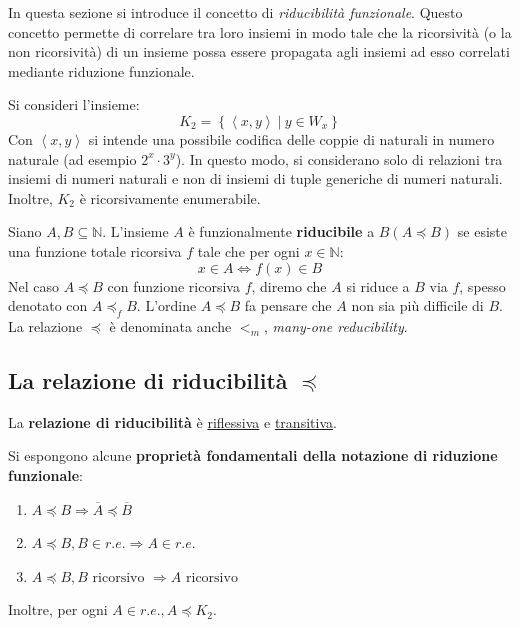 \documentclass[a4paper]{article}
\begin{document}
	In questa sezione si introduce il concetto di \emph{riducibilità funzionale}. Questo concetto permette di correlare tra loro insiemi in modo tale che la ricorsività (o la non ricorsività) di un insieme possa essere propagata agli insiemi ad esso correlati mediante riduzione funzionale.\newline

	\noindent
	Si consideri l'insieme:
	\begin{equation*}
		K_{2} = \left\{\left\langle x,y \right\rangle \: | \: y \in W_{x}\right\}
	\end{equation*}
	Con $\left\langle x,y \right\rangle$ si intende una possibile codifica delle coppie di naturali in numero naturale (ad esempio $2^{x} \cdot 3^{y}$). In questo modo, si considerano solo di relazioni tra insiemi di numeri naturali e non di insiemi di tuple generiche di numeri naturali. Inoltre, $K_{2}$ è ricorsivamente enumerabile.\newline
	
	\noindent
	Siano $A,B \subseteq \mathbb{N}$. L'insieme $A$ è funzionalmente \textcolor{Red3}{\textbf{riducibile}} a $B \left(A \preceq B\right)$ se esiste una funzione totale ricorsiva $f$ tale che per ogni $x \in \mathbb{N}$:
	\begin{equation*}
		x \in A \iff f\left(x\right) \in B
	\end{equation*}
	Nel caso $A \preceq B$ con funzione ricorsiva $f$, diremo che $A$ si riduce a $B$ via $f$, spesso denotato con $A \preceq_{f} B$. L'ordine $A \preceq B$ fa pensare che $A$ non sia più difficile di $B$. La relazione $\preceq$ è denominata anche $<_{m}$, \emph{many-one reducibility}.
	
	\subsection{La relazione di riducibilità $\preceq$}
	
	La \textbf{relazione di riducibilità} è \underline{riflessiva} e \underline{transitiva}.\newline
	
	\noindent
	Si espongono alcune \textcolor{Red3}{\textbf{proprietà fondamentali della notazione di riduzione funzionale}}:
	\begin{enumerate}
		\item $A \preceq B \Longrightarrow \overline{A} \preceq \overline{B}$
		\item $A \preceq B, B \in r.e. \Longrightarrow A \in r.e.$
		\item $A \preceq B, B \text{ ricorsivo } \Longrightarrow A \text{ ricorsivo}$
	\end{enumerate}
	Inoltre, per ogni $A \in r.e., A \preceq K_{2}$.\newline
	
\end{document}
